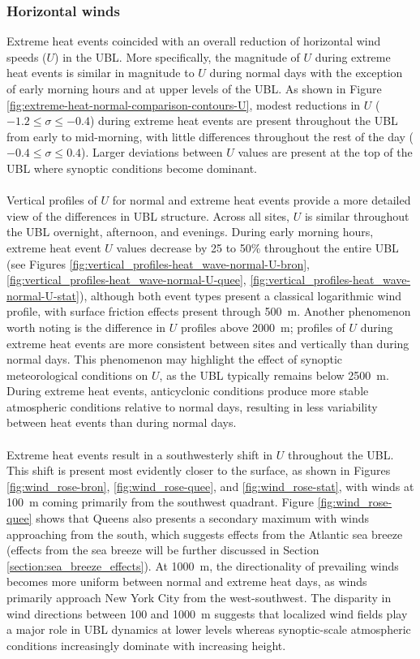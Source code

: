 \documentclass[num-refs]{wiley-article}
\begin{document}
\subsubsection{Horizontal winds}
Extreme heat events coincided with an overall reduction of horizontal wind speeds ($U$) in the UBL. More specifically, the magnitude of $U$ during extreme heat events is similar in magnitude to $U$ during normal days with the exception of early morning hours and at upper levels of the UBL. As shown in Figure \ref{fig:extreme-heat-normal-comparison-contours-U}, modest reductions in $U$ ($-1.2 \leq \sigma \leq -0.4$) during extreme heat events are present throughout the UBL from early to mid-morning, with little differences throughout the rest of the day ($-0.4 \leq \sigma \leq 0.4$). Larger deviations between $U$ values are present at the top of the UBL where synoptic conditions become dominant.
\\ \\
Vertical profiles of $U$ for normal and extreme heat events provide a more detailed view of the differences in UBL structure. Across all sites, $U$ is similar throughout the UBL overnight, afternoon, and evenings. During early morning hours, extreme heat event $U$ values decrease by 25 to 50\% throughout the entire UBL (see Figures \ref{fig:vertical_profiles-heat_wave-normal-U-bron}, \ref{fig:vertical_profiles-heat_wave-normal-U-quee}, \ref{fig:vertical_profiles-heat_wave-normal-U-stat}), although both event types present a classical logarithmic wind profile, with surface friction effects present through \SI{500}{\meter}. Another phenomenon worth noting is the difference in $U$ profiles above \SI{2000}{\meter}; profiles of $U$ during extreme heat events are more consistent between sites and vertically than during normal days. This phenomenon may highlight the effect of synoptic meteorological conditions on $U$, as the UBL typically remains below \SI{2500}{\meter}. During extreme heat events, anticyclonic conditions produce more stable atmospheric conditions relative to normal days, resulting in less variability between heat events than during normal days.
\\ \\
Extreme heat events result in a southwesterly shift in $U$ throughout the UBL. This shift is present most evidently closer to the surface, as shown in Figures \ref{fig:wind_rose-bron}, \ref{fig:wind_rose-quee}, and \ref{fig:wind_rose-stat}, with winds at \SI{100}{\meter} coming primarily from the southwest quadrant. Figure \ref{fig:wind_rose-quee} shows that Queens also presents a secondary maximum with winds approaching from the south, which suggests effects from the Atlantic sea breeze (effects from the sea breeze will be further discussed in Section \ref{section:sea_breeze_effects}). At \SI{1000}{\meter}, the directionality of prevailing winds becomes more uniform between normal and extreme heat days, as winds primarily approach New York City from the west-southwest. The disparity in wind directions between 100 and \SI{1000}{\meter} suggests that localized wind fields play a major role in UBL dynamics at lower levels whereas synoptic-scale atmospheric conditions increasingly dominate with increasing height.
\end{document}
